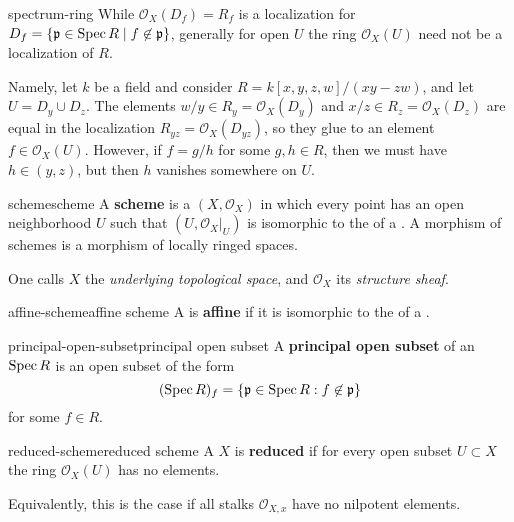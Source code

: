 \begin{example}{spectrum-ring}
    While $\mathcal{O}_X(D_f) = R_f$ is a localization for  $D_f = \{ \mathfrak{p} \in \operatorname{Spec} R \mid f \not\in \mathfrak{p} \}$, generally for open $U$ the ring $\mathcal{O}_X(U)$ need not be a localization of $R$.
    
    Namely, let $k$ be a field and consider $R = k[x, y, z, w] / (xy - zw)$, and let $U = D_y \cup D_z$. The elements $w/y \in R_y = \mathcal{O}_X(D_y)$ and $x/z \in R_z = \mathcal{O}_X(D_z)$ are equal in the localization $R_{yz} = \mathcal{O}_X(D_{yz})$, so they glue to an element $f \in \mathcal{O}_X(U)$. However, if $f = g/h$ for some $g, h \in R$, then we must have $h \in (y, z)$, but then $h$ vanishes somewhere on $U$.
\end{example}

\begin{topic}{scheme}{scheme}
    A \textbf{scheme} is a  $(X, \mathcal{O}_X)$ in which every point has an open neighborhood $U$ such that $(U, \mathcal{O}_X|_U)$ is isomorphic to the  of a . A morphism of schemes is a morphism of locally ringed spaces.
    
    One calls $X$ the \textit{underlying topological space}, and $\mathcal{O}_X$ its \textit{structure sheaf}.
\end{topic}

\begin{topic}{affine-scheme}{affine scheme}
    A  is \textbf{affine} if it is isomorphic to the  of a .
\end{topic}

\begin{topic}{principal-open-subset}{principal open subset}
    A \textbf{principal open subset} of an  $\operatorname{Spec} R$ is an open subset of the form
    \[ (\operatorname{Spec} R)_f = \{ \mathfrak{p} \in \operatorname{Spec} R : f \not\in \mathfrak{p} \} \]
    for some $f \in R$.
\end{topic}

\begin{topic}{reduced-scheme}{reduced scheme}
    A  $X$ is \textbf{reduced} if for every open subset $U \subset X$ the ring $\mathcal{O}_X(U)$ has no  elements.
    
    Equivalently, this is the case if all stalks $\mathcal{O}_{X, x}$ have no nilpotent elements.
\end{topic}

